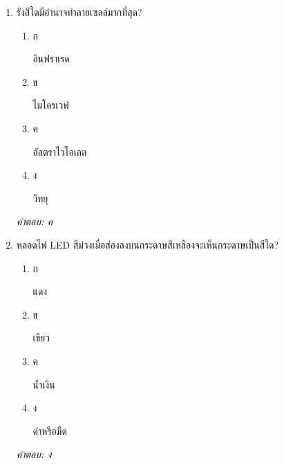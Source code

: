 \documentclass[12pt]{article}
\begin{document}
\begin{enumerate}[label=\arabic*., itemsep=0.5\baselineskip, topsep=0.5\baselineskip, leftmargin=*]
\item รังสีใดมีอำนาจทำลายเซลล์มากที่สุด?
\begin{enumerate}[label=\alph*)., itemsep=0.3\baselineskip, topsep=0.3\baselineskip]
\item ก\ 
\begin{minipage}[t]{0.9\linewidth}
\raggedright อินฟราเรด
\end{minipage}
\item ข\ 
\begin{minipage}[t]{0.9\linewidth}
\raggedright ไมโครเวฟ
\end{minipage}
\item ค\ 
\begin{minipage}[t]{0.9\linewidth}
\raggedright อัลตราไวโอเลต
\end{minipage}
\item ง\ 
\begin{minipage}[t]{0.9\linewidth}
\raggedright วิทยุ
\end{minipage}
\end{enumerate}
\vspace{-0.3\baselineskip}
\begin{small}
\textit{คำตอบ: ค}
\end{small}

\item หลอดไฟ LED สีม่วงเมื่อส่องลงบนกระดาษสีเหลืองจะเห็นกระดาษเป็นสีใด?
\begin{enumerate}[label=\alph*)., itemsep=0.3\baselineskip, topsep=0.3\baselineskip]
\item ก\ 
\begin{minipage}[t]{0.9\linewidth}
\raggedright แดง
\end{minipage}
\item ข\ 
\begin{minipage}[t]{0.9\linewidth}
\raggedright เขียว
\end{minipage}
\item ค\ 
\begin{minipage}[t]{0.9\linewidth}
\raggedright น้ำเงิน
\end{minipage}
\item ง\ 
\begin{minipage}[t]{0.9\linewidth}
\raggedright ดำหรือมืด
\end{minipage}
\end{enumerate}
\vspace{-0.3\baselineskip}
\begin{small}
\textit{คำตอบ: ง}
\end{small}


\end{enumerate}
\end{document}
